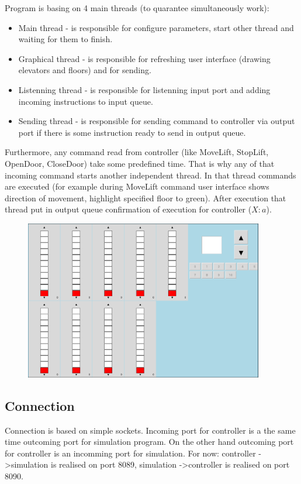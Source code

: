 \documentclass[12pt]{article}
\begin{document}
Program is basing on 4 main threads (to quarantee simultaneously work): 
\begin{itemize}
	\item Main thread - is responsible for configure parameters, start other thread and waiting for them to finish.
	\item Graphical thread - is responsible for refreshing user interface (drawing elevators and floors) and for sending. 
	\item Listenning thread - is responsible for listenning input port and adding incoming instructions to input queue.
	\item Sending thread - is responsible for sending command to controller via output port if there is some instruction ready to send in output queue.		
\end{itemize}

Furthermore, any command read from controller (like MoveLift, StopLift, OpenDoor, CloseDoor) take some predefined time. That is why any of that incoming command starts another independent thread. In that thread commands are executed (for example during MoveLift command user interface shows direction of movement, highlight specified floor to green). After execution that thread put in output queue confirmation of execution for controller ($X:a$).
	\begin{figure}
	\includegraphics[width=0.93\textwidth]{img/winda.png}
	\end{figure}

\subsection{Connection}
Connection is based on simple sockets. Incoming port for controller is a the same time outcoming port for simulation program. On the other hand outcoming port for controller is an incomming port for simulation.
\newline
\newline
For now:
\newline
controller -\textgreater simulation is realised on port 8089,
\newline
simulation -\textgreater controller is realised on port 8090.
\end{document}
